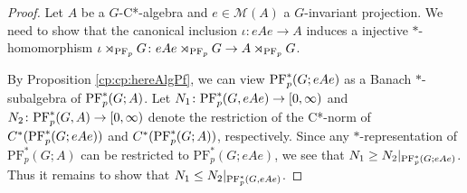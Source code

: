 \documentclass[12pt]{amsart}
\theoremstyle{definition}
\theoremstyle{remark}
\numberwithin{equation}{section}
\newcommand{\PF}[3]{\ensuremath{\mathrm{PF}_{#1}^*\left(#2; #3\right)}}
\begin{document}
\begin{proof}
	Let $A$ be a $G$-C*-algebra and $e\in \mathcal{M}(A)$ a $G$-invariant projection. We need to show that the canonical inclusion $\iota\colon eAe \to A$ induces a injective $*$-homomorphism $\iota\rtimes_{\textup{PF}_p} G \colon eAe\rtimes_{\textup{PF}_p}G \to A\rtimes_{\textup{PF}_p}G$.

By Proposition \ref{cp:cp:hereAlgPf}, we can view $\textup{PF}_p^*(G;eAe)$ as
	a Banach $*$-subalgebra of $\textup{PF}_p^*(G;A)$. Let
$N_1\colon \textup{PF}_p^*(G,eAe)\to[0,\infty)$ and $N_2\colon \textup{PF}_p^*(G,A)\to [0,\infty)$ denote the restriction of the C*-norm of $C^*(\textup{PF}_p^*(G;eAe))$ and $C^*(\textup{PF}_p^*(G;A))$, respectively. Since any $*$-representation of $\PF{p}{G}{A}$ can be restricted to $\PF{p}{G}{eAe}$, we see that $N_1 \geq N_2\vert_{\textup{PF}_p^*(G;eAe)}$. Thus it remains	to show that $N_1 \leq N_2\vert_{\textup{PF}_p^*(G,eAe)}$.
	

\end{proof}
\end{document}
